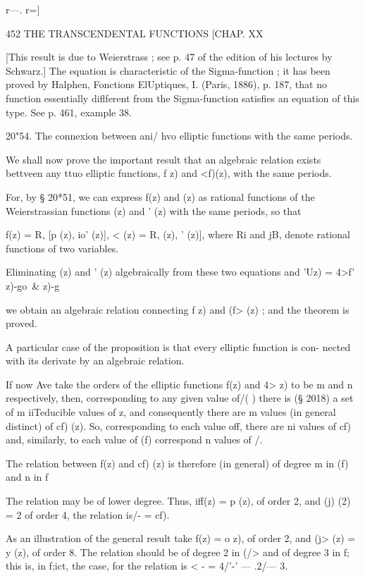 {r—. r=]

452 THE TRANSCENDENTAL FUNCTIONS [CHAP. XX

[This result is due to Weierstrass ; see p. 47 of the edition of his
lectures by Schwarz.] The equation is characteristic of the
Sigma-function ; it has been proved by Halphen, Fonctions ElUptiques,
I. (Paris, 1886), p. 187, that no function essentially diflferent from
the Sigma-function satisfies an equation of this type. See p. 461,
example 38.

20"54. The connexion between ani/ hvo elliptic functions with the same
periods.

We shall now prove the important result that an algebraic relation
exists bettveen any ttuo elliptic functions, f z) and <f)(z), with the
same periods.

For, by § 20*51, we can express f(z) and (z) as rational functions of
the Weierstrassian functions (z) and ' (z) with the same periods, so
that

f(z) = R, [p (z), io' (z)], < (z) = R, (z), ' (z)], where Ri and jB,
denote rational functions of two variables.

Eliminating (z) and ' (z) algebraically from these two equations and
'Uz) = 4>f' z)-go\ \& z)-g

we obtain an algebraic relation connecting f z) and (f> (z) ; and the
theorem is proved.

A particular case of the proposition is that every elliptic function
is con- nected with its derivate by an algebraic relation.

If now Ave take the orders of the elliptic functions f(z) and 4> z) to
be m and n respectively, then, corresponding to any given value of/( )
there is (§ 2018) a set of m iiTeducible values of z, and consequently
there are m values (in general distinct) of cf) (z). So, corresponding
to each value off, there are ni values of cf) and, similarly, to each
value of (f) correspond n values of /.

The relation between f(z) and cf) (z) is therefore (in general) of
degree m in (f) and n in f

The relation may be of lower degree. Thus, iff(z) = p (z), of order 2,
and (j) (2) = 2 of order 4, the relation is/- = cf).

As an illustration of the general result take f(z) = o z), of order 2,
and (j> (z) = y (z), of order 8. The relation should be of degree 2 in
(/> and of degree 3 in f; this is, in f;ict, the case, for the
relation is < - = 4/'-' — .2/— 3.

}
